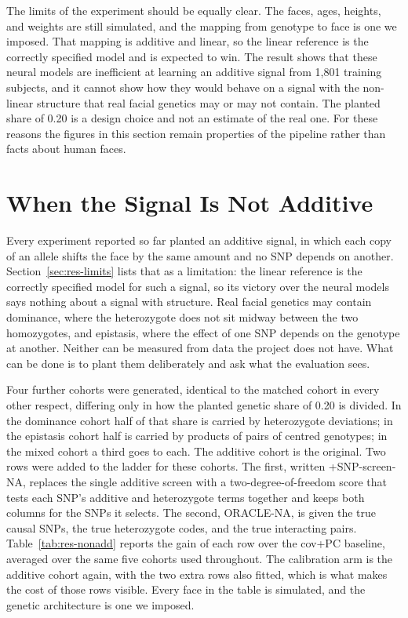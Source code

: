 The limits of the experiment should be equally clear. The faces, ages, heights, and weights are still simulated, and the mapping from genotype to face is one we imposed. That mapping is additive and linear, so the linear reference is the correctly specified model and is expected to win. The result shows that these neural models are inefficient at learning an additive signal from 1{,}801 training subjects, and it cannot show how they would behave on a signal with the non-linear structure that real facial genetics may or may not contain. The planted share of 0.20 is a design choice and not an estimate of the real one. For these reasons the figures in this section remain properties of the pipeline rather than facts about human faces.

\section{When the Signal Is Not Additive}
\label{sec:res-nonadd}
Every experiment reported so far planted an additive signal, in which each copy of an allele shifts the face by the same amount and no SNP depends on another. Section~\ref{sec:res-limits} lists that as a limitation: the linear reference is the correctly specified model for such a signal, so its victory over the neural models says nothing about a signal with structure. Real facial genetics may contain dominance, where the heterozygote does not sit midway between the two homozygotes, and epistasis, where the effect of one SNP depends on the genotype at another. Neither can be measured from data the project does not have. What can be done is to plant them deliberately and ask what the evaluation sees.

Four further cohorts were generated, identical to the matched cohort in every other respect, differing only in how the planted genetic share of 0.20 is divided. In the dominance cohort half of that share is carried by heterozygote deviations; in the epistasis cohort half is carried by products of pairs of centred genotypes; in the mixed cohort a third goes to each. The additive cohort is the original. Two rows were added to the ladder for these cohorts. The first, written \mbox{+SNP-screen-NA}, replaces the single additive screen with a two-degree-of-freedom score that tests each SNP's additive and heterozygote terms together and keeps both columns for the SNPs it selects. The second, ORACLE-NA, is given the true causal SNPs, the true heterozygote codes, and the true interacting pairs. Table~\ref{tab:res-nonadd} reports the gain of each row over the \mbox{cov+PC} baseline, averaged over the same five cohorts used throughout. The calibration arm is the additive cohort again, with the two extra rows also fitted, which is what makes the cost of those rows visible. Every face in the table is simulated, and the genetic architecture is one we imposed.

